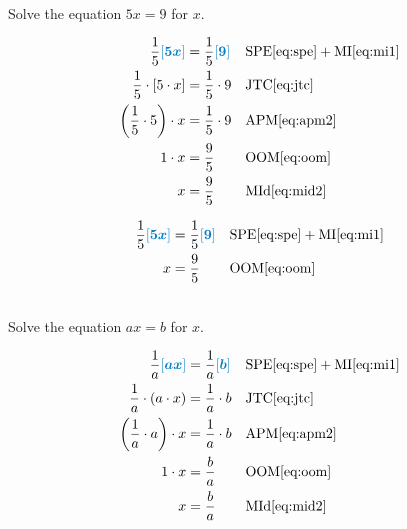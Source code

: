 \begin{example}[id:20141206-102404] \label{20141206-102404} \hfill \\

Solve the equation $5x=9$ for $x$.

\soln

\solnsteps
\begin{align*}
\dfrac{1}{5}\farg{5x} &= \dfrac{1}{5}\farg{9} && \text{SPE} \eqref{eq:spe} + \text{MI} \eqref{eq:mi1} \\
\dfrac{1}{5} \cdot \left[ 5 \cdot x \right] &= \dfrac{1}{5} \cdot 9 && \text{JTC} \eqref{eq:jtc} \\
\left(\dfrac{1}{5} \cdot 5 \right) \cdot x &= \dfrac{1}{5} \cdot 9  && \text{APM} \eqref{eq:apm2} \\ 
1\cdot x &= \dfrac{9}{5}  && \text{OOM} \eqref{eq:oom} \\
x &= \dfrac{9}{5}  && \text{MId} \eqref{eq:mid2}  
\end{align*}

\soln

\lesssteps
\begin{align*}
\dfrac{1}{5}\farg{5x} &= \dfrac{1}{5}\farg{9} && \text{SPE} \eqref{eq:spe} + \text{MI} \eqref{eq:mi1} \\ 
x &= \dfrac{9}{5}  && \text{OOM} \eqref{eq:oom} 
\end{align*}
\end{example}

\begin{example}[id:20141206-104404] \label{20141206-104404} \hfill \\

Solve the equation $ax=b$ for $x$.

\soln

\solnsteps
\begin{align*}
\dfrac{1}{a}\farg{ax} &= \dfrac{1}{a}\farg{b} && \text{SPE} \eqref{eq:spe} + \text{MI} \eqref{eq:mi1} \\
\dfrac{1}{a} \cdot \left( a \cdot x \right) &= \dfrac{1}{a} \cdot b && \text{JTC} \eqref{eq:jtc} \\
\left(\dfrac{1}{a} \cdot a \right) \cdot x &= \dfrac{1}{a} \cdot b  && \text{APM} \eqref{eq:apm2} \\ 
1\cdot x &= \dfrac{b}{a}  && \text{OOM} \eqref{eq:oom} \\
x &= \dfrac{b}{a}  && \text{MId} \eqref{eq:mid2} 
\end{align*}
\end{example}

